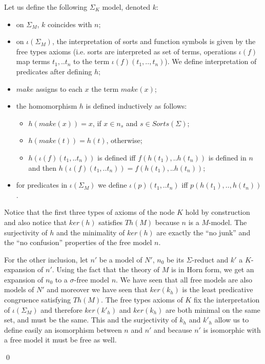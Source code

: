 Let us define the following $\Sigma_K$ model, denoted $k$:

\begin{itemize}

\item on $\Sigma_M$, $k$ coincides with $n$;

\item on $\iota(\Sigma_M)$, the interpretation of sorts and function symbols 
is given by the free types axioms (i.e. sorts are interpreted as set of terms, 
operations $\iota(f)$ map terms $t_1,..t_n$ to the term
$\iota(f)(t_1,..,t_n)$).  We define interpretation of predicates after defining $h$;

\item $make$ assigns to each $x$ the term $make(x)$;

\item the homomorphism $h$ is defined inductively as follows:

 \begin{itemize}

  \item $h(make(x)) = x$, if $x \in n_s$ and $s\in Sorts(\Sigma)$;

 \item $h(make(t)) = h(t)$, otherwise;

 \item $h(\iota(f)(t_1,..t_n))$ is defined iff $f(h(t_1), ..h(t_n))$ is defined in $n$
          and then  $h(\iota(f)(t_1,..t_n)) = f(h(t_1), ..h(t_n))$;
 \end{itemize}

\item for predicates in $\iota(\Sigma_M)$ we define
         $\iota(p)(t_1,..t_n)$ iff $p(h(t_1),..,h(t_n))$.

\end{itemize}

Notice that the first three types of axioms of the node $K$ hold by construction and also
notice that $ker(h)$ satisfies $Th(M)$ because $n$ is a $M$-model.
The surjectivity of $h$ and the minimality of $ker(h)$ are exactly the
``no junk'' and the ``no confusion'' properties of the free model $n$.  

For the other inclusion, let $n'$ be a model of $N'$, $n_0$ be its $\Sigma$-reduct and
$k'$ a $K$-expansion of $n'$.
Using the fact that the theory of $M$ is in Horn form, we get an expansion of $n_0$ to a
$\sigma$-free model $n$. We have seen that all free models are also models of $N'$ and moreover
we have seen that $ker(k_h)$ is the least predicative congruence satisfying $Th(M)$. The free types 
axioms of $K$ fix the interpretation of $\iota(\Sigma_M)$ and therefore $ker(k'_h)$ and
$ker(k_h)$ are both minimal on the same set, and must be the same. This and the surjectivity
of $k_h$ and $k'_h$ allow us to define easily
an isomorphism between $n$ and $n'$ and because $n'$ is isomorphic with a free model it must be free as well.

\qed





























